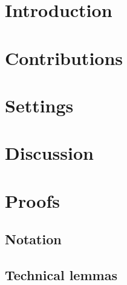 




\maketitle

\begin{abstract}

\end{abstract}

\section{Introduction}



\section{Contributions} 


\section{Settings} 


\section{Discussion}





\tableofcontents
\newpage

\section{Proofs} \label{sec:proofs}

\subsection{Notation}


\subsection{Technical lemmas}


